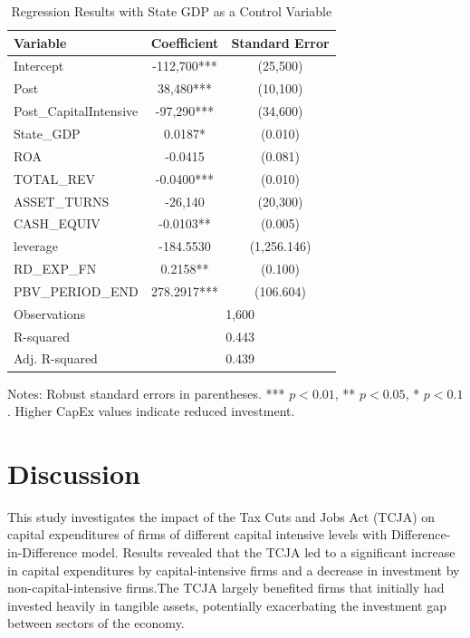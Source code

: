 \documentclass[11pt]{article}
\begin{document}
\begin{table}[htbp]
    \centering
    \caption{Regression Results with State GDP as a Control Variable}
    \label{GDPTest}
    \begin{tabular}{lcc}
        \toprule
        \textbf{Variable} & \textbf{Coefficient} & \textbf{Standard Error} \\
        \midrule
        Intercept & -112,700*** & (25,500) \\
        Post & 38,480*** & (10,100) \\
        Post\_CapitalIntensive & -97,290*** & (34,600) \\
        State\_GDP & 0.0187* & (0.010) \\
        ROA & -0.0415 & (0.081) \\
        TOTAL\_REV & -0.0400*** & (0.010) \\
        ASSET\_TURNS & -26,140 & (20,300) \\
        CASH\_EQUIV & -0.0103** & (0.005) \\
        leverage & -184.5530 & (1,256.146) \\
        RD\_EXP\_FN & 0.2158** & (0.100) \\
        PBV\_PERIOD\_END & 278.2917*** & (106.604) \\
        \midrule
        Observations & \multicolumn{2}{c}{1,600} \\
        R-squared & \multicolumn{2}{c}{0.443} \\
        Adj. R-squared & \multicolumn{2}{c}{0.439} \\
        \bottomrule
    \end{tabular}
    \begin{flushleft}
        \footnotesize
        Notes: Robust standard errors in parentheses. *** \(p<0.01\), ** \(p<0.05\), * \(p<0.1\). Higher CapEx values indicate reduced investment.
    \end{flushleft}
\end{table}


\section{Discussion}
This study investigates the impact of the Tax Cuts and Jobs Act (TCJA) on capital expenditures of firms of different capital intensive levels with Difference-in-Difference model. Results revealed that the TCJA led to a significant increase in capital expenditures by capital-intensive firms and a decrease in investment by non-capital-intensive firms.The TCJA largely benefited firms that initially had invested heavily in tangible assets, potentially exacerbating the investment gap between sectors of the economy.
\end{document}
